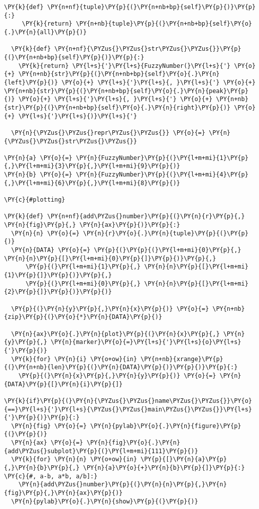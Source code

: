 \begin{Verbatim}[commandchars=\\\{\}]
  \PY{k}{def} \PY{n+nf}{tuple}\PY{p}{(}\PY{n+nb+bp}{self}\PY{p}{)}\PY{p}{:}
     \PY{k}{return} \PY{n+nb}{tuple}\PY{p}{(}\PY{n+nb+bp}{self}\PY{o}{.}\PY{n}{all}\PY{p}{)}

  \PY{k}{def} \PY{n+nf}{\PYZus{}\PYZus{}str\PYZus{}\PYZus{}}\PY{p}{(}\PY{n+nb+bp}{self}\PY{p}{)}\PY{p}{:}
    \PY{k}{return} \PY{l+s}{'}\PY{l+s}{FuzzyNumber(}\PY{l+s}{'} \PY{o}{+} \PY{n+nb}{str}\PY{p}{(}\PY{n+nb+bp}{self}\PY{o}{.}\PY{n}{left}\PY{p}{)} \PY{o}{+} \PY{l+s}{'}\PY{l+s}{, }\PY{l+s}{'} \PY{o}{+} \PY{n+nb}{str}\PY{p}{(}\PY{n+nb+bp}{self}\PY{o}{.}\PY{n}{peak}\PY{p}{)} \PY{o}{+} \PY{l+s}{'}\PY{l+s}{, }\PY{l+s}{'} \PY{o}{+} \PY{n+nb}{str}\PY{p}{(}\PY{n+nb+bp}{self}\PY{o}{.}\PY{n}{right}\PY{p}{)} \PY{o}{+} \PY{l+s}{'}\PY{l+s}{)}\PY{l+s}{'}

  \PY{n}{\PYZus{}\PYZus{}repr\PYZus{}\PYZus{}} \PY{o}{=} \PY{n}{\PYZus{}\PYZus{}str\PYZus{}\PYZus{}}

\PY{n}{a} \PY{o}{=} \PY{n}{FuzzyNumber}\PY{p}{(}\PY{l+m+mi}{1}\PY{p}{,}\PY{l+m+mi}{3}\PY{p}{,}\PY{l+m+mi}{9}\PY{p}{)}
\PY{n}{b} \PY{o}{=} \PY{n}{FuzzyNumber}\PY{p}{(}\PY{l+m+mi}{4}\PY{p}{,}\PY{l+m+mi}{6}\PY{p}{,}\PY{l+m+mi}{8}\PY{p}{)}

\PY{c}{#plotting}

\PY{k}{def} \PY{n+nf}{add\PYZus{}number}\PY{p}{(}\PY{n}{r}\PY{p}{,} \PY{n}{fig}\PY{p}{,} \PY{n}{ax}\PY{p}{)}\PY{p}{:}
  \PY{n}{n} \PY{o}{=} \PY{n}{r}\PY{o}{.}\PY{n}{tuple}\PY{p}{(}\PY{p}{)}
  \PY{n}{DATA} \PY{o}{=} \PY{p}{(}\PY{p}{(}\PY{l+m+mi}{0}\PY{p}{,} \PY{n}{n}\PY{p}{[}\PY{l+m+mi}{0}\PY{p}{]}\PY{p}{)}\PY{p}{,}
      \PY{p}{(}\PY{l+m+mi}{1}\PY{p}{,} \PY{n}{n}\PY{p}{[}\PY{l+m+mi}{1}\PY{p}{]}\PY{p}{)}\PY{p}{,}
      \PY{p}{(}\PY{l+m+mi}{0}\PY{p}{,} \PY{n}{n}\PY{p}{[}\PY{l+m+mi}{2}\PY{p}{]}\PY{p}{)}\PY{p}{)}

  \PY{p}{(}\PY{n}{y}\PY{p}{,}\PY{n}{x}\PY{p}{)} \PY{o}{=} \PY{n+nb}{zip}\PY{p}{(}\PY{o}{*}\PY{n}{DATA}\PY{p}{)}

  \PY{n}{ax}\PY{o}{.}\PY{n}{plot}\PY{p}{(}\PY{n}{x}\PY{p}{,} \PY{n}{y}\PY{p}{,} \PY{n}{marker}\PY{o}{=}\PY{l+s}{'}\PY{l+s}{o}\PY{l+s}{'}\PY{p}{)}
  \PY{k}{for} \PY{n}{i} \PY{o+ow}{in} \PY{n+nb}{xrange}\PY{p}{(}\PY{n+nb}{len}\PY{p}{(}\PY{n}{DATA}\PY{p}{)}\PY{p}{)}\PY{p}{:}
    \PY{p}{(}\PY{n}{x}\PY{p}{,}\PY{n}{y}\PY{p}{)} \PY{o}{=} \PY{n}{DATA}\PY{p}{[}\PY{n}{i}\PY{p}{]}

\PY{k}{if}\PY{p}{(}\PY{n}{\PYZus{}\PYZus{}name\PYZus{}\PYZus{}}\PY{o}{==}\PY{l+s}{'}\PY{l+s}{\PYZus{}\PYZus{}main\PYZus{}\PYZus{}}\PY{l+s}{'}\PY{p}{)}\PY{p}{:}
  \PY{n}{fig} \PY{o}{=} \PY{n}{pylab}\PY{o}{.}\PY{n}{figure}\PY{p}{(}\PY{p}{)}
  \PY{n}{ax} \PY{o}{=} \PY{n}{fig}\PY{o}{.}\PY{n}{add\PYZus{}subplot}\PY{p}{(}\PY{l+m+mi}{111}\PY{p}{)}
  \PY{k}{for} \PY{n}{n} \PY{o+ow}{in} \PY{p}{[}\PY{n}{a}\PY{p}{,}\PY{n}{b}\PY{p}{,} \PY{n}{a}\PY{o}{+}\PY{n}{b}\PY{p}{]}\PY{p}{:} \PY{c}{#, a-b, a*b, a/b]:}
    \PY{n}{add\PYZus{}number}\PY{p}{(}\PY{n}{n}\PY{p}{,}\PY{n}{fig}\PY{p}{,}\PY{n}{ax}\PY{p}{)}
  \PY{n}{pylab}\PY{o}{.}\PY{n}{show}\PY{p}{(}\PY{p}{)}
\end{Verbatim}

